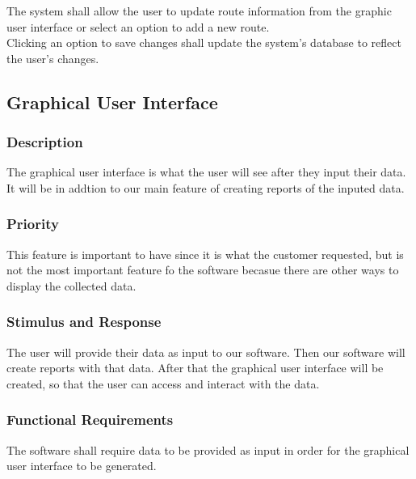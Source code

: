 The system shall allow the user to update route information from the graphic user interface or select an option to add a new route. \\

Clicking an option to save changes shall update the system's database to reflect the user's changes.


\subsection{Graphical User Interface}

\subsubsection{Description}

The graphical user interface is what the user will see after they input their data. It will be in addtion to our main feature of creating reports of the inputed data.

\subsubsection{Priority}

This feature is important to have since it is what the customer requested, but is not the most important feature fo the software becasue there are other ways to display the collected data.

\subsubsection{Stimulus and Response}

The user will provide their data as input to our software. Then our software will create reports with that data. After that the graphical user interface will be created, so that the user can access and interact with the data. 

\subsubsection{Functional Requirements}

The software shall require data to be provided as input in order for the graphical user interface to be generated.


